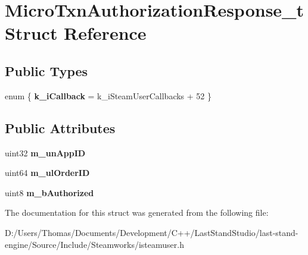 \hypertarget{structMicroTxnAuthorizationResponse__t}{}\section{Micro\+Txn\+Authorization\+Response\+\_\+t Struct Reference}
\label{structMicroTxnAuthorizationResponse__t}
\subsection*{Public Types}
\begin{DoxyCompactItemize}
\item 
\hypertarget{structMicroTxnAuthorizationResponse__t_a0cf65967a134ec32a9b189244fb73bbb}{}enum \{ {\bfseries k\+\_\+i\+Callback} = k\+\_\+i\+Steam\+User\+Callbacks + 52
 \}\label{structMicroTxnAuthorizationResponse__t_a0cf65967a134ec32a9b189244fb73bbb}

\end{DoxyCompactItemize}
\subsection*{Public Attributes}
\begin{DoxyCompactItemize}
\item 
\hypertarget{structMicroTxnAuthorizationResponse__t_a6ef2b8c6deb7831cdfcd6d9277d06c62}{}uint32 {\bfseries m\+\_\+un\+App\+I\+D}\label{structMicroTxnAuthorizationResponse__t_a6ef2b8c6deb7831cdfcd6d9277d06c62}

\item 
\hypertarget{structMicroTxnAuthorizationResponse__t_a38de75bcdc25ddc7123c23dd764de240}{}uint64 {\bfseries m\+\_\+ul\+Order\+I\+D}\label{structMicroTxnAuthorizationResponse__t_a38de75bcdc25ddc7123c23dd764de240}

\item 
\hypertarget{structMicroTxnAuthorizationResponse__t_acceaade7e06f5a706d5112fb18d7fcfb}{}uint8 {\bfseries m\+\_\+b\+Authorized}\label{structMicroTxnAuthorizationResponse__t_acceaade7e06f5a706d5112fb18d7fcfb}

\end{DoxyCompactItemize}


The documentation for this struct was generated from the following file\+:\begin{DoxyCompactItemize}
\item 
D\+:/\+Users/\+Thomas/\+Documents/\+Development/\+C++/\+Last\+Stand\+Studio/last-\/stand-\/engine/\+Source/\+Include/\+Steamworks/isteamuser.\+h\end{DoxyCompactItemize}
